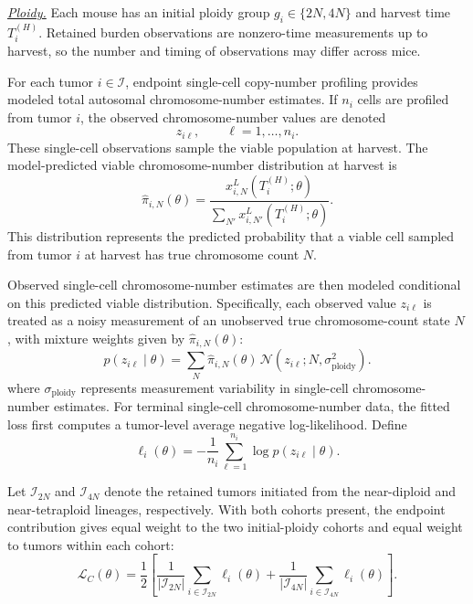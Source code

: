 \documentclass[11pt]{article}
\begin{document}
\underline{\textit{Ploidy.}} Each mouse has an initial ploidy group $g_i\in\{2N,4N\}$ and harvest time $T_i^{(H)}$. Retained burden observations are nonzero-time measurements up to harvest, so the number and timing of observations may differ across mice.

For each tumor $i\in\mathcal I$, endpoint single-cell copy-number profiling provides modeled total autosomal chromosome-number estimates. If $n_i$ cells are profiled from tumor $i$, the observed chromosome-number values are denoted
\begin{equation}
z_{i\ell},\qquad \ell=1,\dots,n_i.
\label{eq:appendix_observed_chromosome_values}
\end{equation}
These single-cell observations sample the viable population at harvest. The model-predicted viable chromosome-number distribution at harvest is
\begin{equation}
\widehat{\pi}_{i,N}(\theta)
=
\frac{
x^{L}_{i,N}(T_i^{(H)};\theta)
}{
\sum_{N'}
x^{L}_{i,N'}(T_i^{(H)};\theta)
}.
\label{eq:appendix_ploidy_distribution}
\end{equation}
This distribution represents the predicted probability that a viable cell sampled from tumor $i$ at harvest has true chromosome count $N$.

Observed single-cell chromosome-number estimates are then modeled conditional on this predicted viable distribution. Specifically, each observed value $z_{i\ell}$ is treated as a noisy measurement of an unobserved true chromosome-count state $N$, with mixture weights given by $\widehat{\pi}_{i,N}(\theta)$:
\begin{equation}
p(z_{i\ell}\mid \theta)
=
\sum_N
\widehat{\pi}_{i,N}(\theta)
\,
\mathcal N
\!\left(
z_{i\ell};
N,
\sigma_{\mathrm{ploidy}}^2
\right).
\label{eq:appendix_ploidy_likelihood}
\end{equation}
where $\sigma_{\mathrm{ploidy}}$ represents measurement variability in single-cell chromosome-number estimates. For terminal single-cell chromosome-number data, the fitted loss first computes a tumor-level average negative log-likelihood. Define
\begin{equation}
\ell_i(\theta)
=
-\frac{1}{n_i}
\sum_{\ell=1}^{n_i}
\log
p(z_{i\ell}\mid \theta).
\label{eq:appendix_ploidy_loss_tumor}
\end{equation}

Let $\mathcal I_{2N}$ and $\mathcal I_{4N}$ denote the retained tumors initiated from the near-diploid and near-tetraploid lineages, respectively. With both cohorts present, the endpoint contribution gives equal weight to the two initial-ploidy cohorts and equal weight to tumors within each cohort:
\begin{equation}
\mathcal L_C(\theta)
=
\frac{1}{2}
\left[
\frac{1}{|\mathcal I_{2N}|}
\sum_{i\in\mathcal I_{2N}}\ell_i(\theta)
+
\frac{1}{|\mathcal I_{4N}|}
\sum_{i\in\mathcal I_{4N}}\ell_i(\theta)
\right].
\label{eq:appendix_ploidy_loss}
\end{equation}
\end{document}
